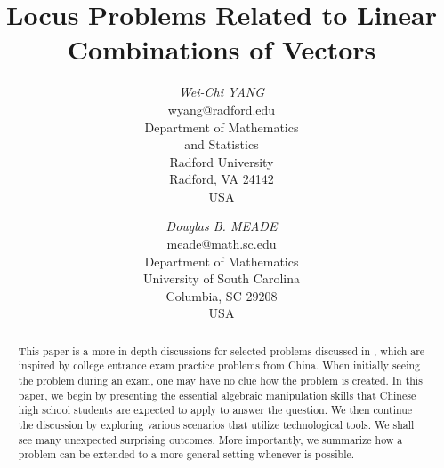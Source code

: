 \documentclass[12pt,a4paper]{article}%
\begin{document}
\title{\textbf{Locus Problems Related to Linear Combinations of Vectors}}

\author{\textit{Wei-Chi YANG}\\wyang@radford.edu\\Department of Mathematics \\and Statistics\\Radford University\\Radford, VA 24142\\USA
\and
\textit{Douglas B. MEADE}\\meade@math.sc.edu\\Department of Mathematics\\University of South Carolina\\Columbia, SC 29208\\USA}
\date{}
\maketitle

\begin{abstract}
This paper is a more in-depth discussions for selected problems discussed in
\cite{ATCM2018}, which are inspired by college entrance exam practice problems
from China. When initially seeing the problem during an
exam, one may have no clue how the problem is created. In this paper, we
begin by presenting the essential algebraic manipulation skills that
Chinese high school students are expected to apply to answer the question.
We then continue the discussion by exploring
various scenarios that utilize technological tools. We shall
see many unexpected surprising outcomes. More importantly, we summarize how a
problem can be extended to a more general setting whenever is possible.

\end{abstract}


%


%
\thispagestyle{fancy}
\end{document}
